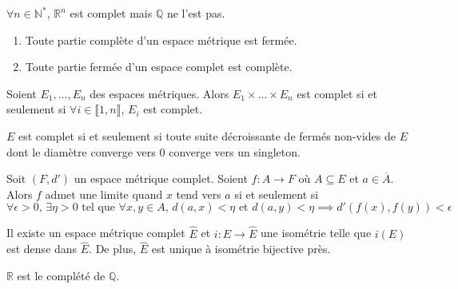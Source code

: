  \begin{example}
    $\forall n \in \mathbb{N}^*$, $\mathbb{R}^n$ est complet mais $\mathbb{Q}$ ne l'est pas.
  \end{example}

  \begin{proposition}
    \begin{enumerate}[label=(\roman*)]
      \item Toute partie complète d'un espace métrique est fermée.
      \item Toute partie fermée d'un espace complet est complète.
    \end{enumerate}
  \end{proposition}

  \begin{proposition}
    Soient $E_1, \dots, E_n$ des espaces métriques. Alors $E_1 \times \dots \times E_n$ est complet si et seulement si $\forall i \in \llbracket 1, n \rrbracket$, $E_i$ est complet.
  \end{proposition}

  \begin{proposition}
    $E$ est complet si et seulement si toute suite décroissante de fermés non-vides de $E$ dont le diamètre converge vers $0$ converge vers un singleton.
  \end{proposition}

  \begin{proposition}
    Soit $(F, d')$ un espace métrique complet. Soient $f : A \rightarrow F$ où $A \subseteq E$ et $a \in \overline{A}$. Alors $f$ admet une limite quand $x$ tend vers $a$ si et seulement si
    \[ \forall \epsilon > 0, \, \exists \eta > 0 \text{ tel que } \forall x, y \in A, \, d(a,x) < \eta \text{ et } d(a,y) < \eta \implies d'(f(x), f(y)) < \epsilon \]
  \end{proposition}


  \begin{theorem}
    Il existe un espace métrique complet $\widehat{E}$ et $i : E \rightarrow \widehat{E}$ une isométrie telle que $i(E)$ est dense dans $\widehat{E}$. De plus, $\widehat{E}$ est unique à isométrie bijective près.
  \end{theorem}

  \begin{example}
    $\mathbb{R}$ est le complété de $\mathbb{Q}$.
  \end{example}

